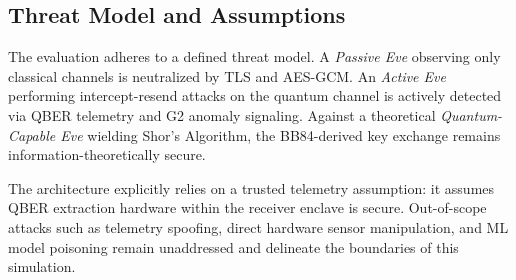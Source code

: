 \subsection{Threat Model and Assumptions}
The evaluation adheres to a defined threat model. A \textit{Passive Eve} observing only classical channels is neutralized by TLS and AES-GCM. An \textit{Active Eve} performing intercept-resend attacks on the quantum channel is actively detected via QBER telemetry and G2 anomaly signaling. Against a theoretical \textit{Quantum-Capable Eve} wielding Shor's Algorithm, the BB84-derived key exchange remains information-theoretically secure.

The architecture explicitly relies on a trusted telemetry assumption: it assumes QBER extraction hardware within the receiver enclave is secure. Out-of-scope attacks such as telemetry spoofing, direct hardware sensor manipulation, and ML model poisoning remain unaddressed and delineate the boundaries of this simulation.
